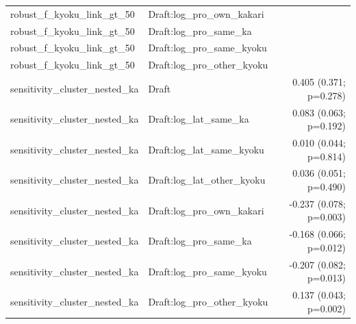 \begin{table}[!htbp]
\begin{tabular}{llr}
robust_f_kyoku_link_gt_50 & Draft:log_pro_own_kakari & 
\\
robust_f_kyoku_link_gt_50 & Draft:log_pro_same_ka & 
\\
robust_f_kyoku_link_gt_50 & Draft:log_pro_same_kyoku & 
\\
robust_f_kyoku_link_gt_50 & Draft:log_pro_other_kyoku & 
\\
sensitivity_cluster_nested_ka & Draft & 0.405 (0.371; p=0.278)
\\
sensitivity_cluster_nested_ka & Draft:log_lat_same_ka & 0.083 (0.063; p=0.192)
\\
sensitivity_cluster_nested_ka & Draft:log_lat_same_kyoku & 0.010 (0.044; p=0.814)
\\
sensitivity_cluster_nested_ka & Draft:log_lat_other_kyoku & 0.036 (0.051; p=0.490)
\\
sensitivity_cluster_nested_ka & Draft:log_pro_own_kakari & -0.237 (0.078; p=0.003)
\\
sensitivity_cluster_nested_ka & Draft:log_pro_same_ka & -0.168 (0.066; p=0.012)
\\
sensitivity_cluster_nested_ka & Draft:log_pro_same_kyoku & -0.207 (0.082; p=0.013)
\\
sensitivity_cluster_nested_ka & Draft:log_pro_other_kyoku & 0.137 (0.043; p=0.002)
\\
\hline
\end{tabular}
\end{table}
